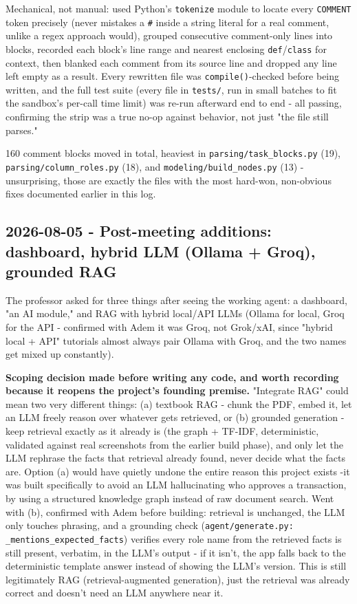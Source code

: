 Mechanical, not manual: used Python's \texttt{tokenize} module to locate every \texttt{COMMENT} token precisely (never mistakes a \texttt{\#} inside a string literal for a real comment, unlike a regex approach would), grouped consecutive comment-only lines into blocks, recorded each block's line range and nearest enclosing \texttt{def}/\texttt{class} for context, then blanked each comment from its source line and dropped any line left empty as a result. Every rewritten file was \texttt{compile()}-checked before being written, and the full test suite (every file in \texttt{tests/\allowbreak{}}, run in small batches to fit the sandbox's per-call time limit) was re-run afterward end to end - all passing, confirming the strip was a true no-op against behavior, not just "the file still parses."

160 comment blocks moved in total, heaviest in \texttt{parsing/\allowbreak{}task\_\allowbreak{}blocks.py} (19), \texttt{parsing/\allowbreak{}column\_\allowbreak{}roles.py} (18), and \texttt{modeling/\allowbreak{}build\_\allowbreak{}nodes.py} (13) - unsurprising, those are exactly the files with the most hard-won, non-obvious fixes documented earlier in this log.

\subsection*{2026-08-05 - Post-meeting additions: dashboard, hybrid LLM (Ollama + Groq), grounded RAG}
The professor asked for three things after seeing the working agent: a dashboard, "an AI module," and RAG with hybrid local/API LLMs (Ollama for local, Groq for the API - confirmed with Adem it was Groq, not Grok/xAI, since "hybrid local + API" tutorials almost always pair Ollama with Groq, and the two names get mixed up constantly).

\textbf{Scoping decision made before writing any code, and worth recording because it reopens the project's founding premise.} "Integrate RAG" could mean two very different things: (a) textbook RAG - chunk the PDF, embed it, let an LLM freely reason over whatever gets retrieved, or (b) grounded generation - keep retrieval exactly as it already is (the graph + TF-IDF, deterministic, validated against real screenshots from the earlier build phase), and only let the LLM rephrase the facts that retrieval already found, never decide what the facts are. Option (a) would have quietly undone the entire reason this project exists -it was built specifically to avoid an LLM hallucinating who approves a transaction, by using a structured knowledge graph instead of raw document search. Went with (b), confirmed with Adem before building: retrieval is unchanged, the LLM only touches phrasing, and a grounding check (\texttt{agent/\allowbreak{}generate.py: \_\allowbreak{}mentions\_\allowbreak{}expected\_\allowbreak{}facts}) verifies every role name from the retrieved facts is still present, verbatim, in the LLM's output - if it isn't, the app falls back to the deterministic template answer instead of showing the LLM's version. This is still legitimately RAG (retrieval-augmented generation), just the retrieval was already correct and doesn't need an LLM anywhere near it.

